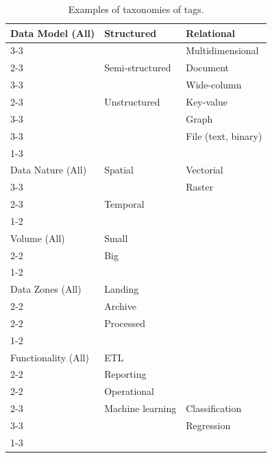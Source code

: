 \begin{table}[!ht]
\centering
\scriptsize
\caption{Examples of taxonomies of tags.}
\label{tab:pdd-tags}
\begin{tabular}{lll}
Data Model (All)        & Structured            & Relational\\\cline{3-3}
                        &                       & Multidimensional\\\cline{2-3}
                        & Semi-structured       & Document\\\cline{3-3}
                        &                       & Wide-column\\\cline{2-3}
                        & Unstructured          & Key-value\\\cline{3-3}
                        &                       & Graph\\\cline{3-3}
                        &                       & File (text, binary)\\\cline{1-3}
&&\\
Data Nature (All)       & Spatial               & Vectorial\\\cline{3-3}
                        &                       & Raster\\\cline{2-3}
                        & Temporal              & \\\cline{1-2}
&&\\
Volume (All)            & Small                 & \\\cline{2-2}
                        & Big                   & \\\cline{1-2}
&&\\
Data Zones (All)   & Landing               & \\\cline{2-2}
                        & Archive               & \\\cline{2-2}
                        & Processed             & \\\cline{1-2}
&&\\
Functionality (All)& ETL                   & \\\cline{2-2}
                        & Reporting        & \\\cline{2-2}
                        & Operational           & \\\cline{2-3}
                        & Machine learning      & Classification\\\cline{3-3}
                        &                       & Regression\\\cline{1-3}
&&\\

\end{tabular}
\end{table}
